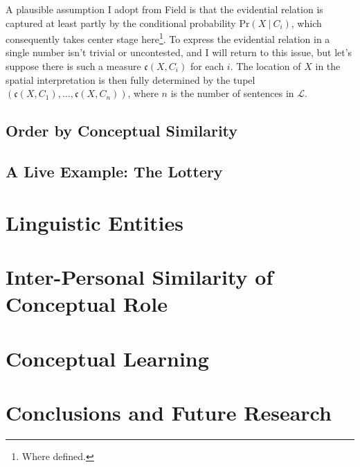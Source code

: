 \documentclass[11pt, a4paper]{article}
\newcommand{\given}[1][]{\:#1\vert\:}
\begin{document}
A plausible assumption I adopt from Field is that the evidential relation is captured at least partly by the conditional probability $\text{Pr}(X \given C_i)$, which consequently takes center stage here\footnote{Where defined.}. To express the evidential relation in a single number isn't trivial or uncontested, and I will return to this issue, but let's suppose there is such a measure $\mathfrak{c}(X,C_i)$ for each $i$. The location of $X$ in the spatial interpretation is then fully determined by the tupel $(\mathfrak{c}({X, C_1}),\dots, \mathfrak{c}(X, C_n))$, where $n$ is the number of sentences in $\mathcal{L}$. 



\subsection{Order by Conceptual Similarity}
\subsection{A Live Example: The Lottery}
\section{Linguistic Entities}
\section{Inter-Personal Similarity of Conceptual Role}
\section{Conceptual Learning}
\section{Conclusions and Future Research}

\nocite{*}
\printbibliography{}
\end{document}
